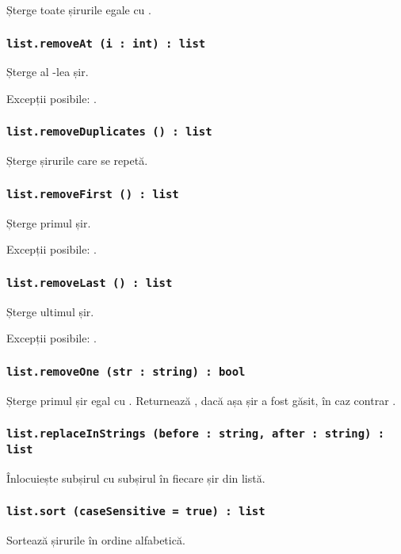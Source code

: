 Șterge toate șirurile egale cu .

\subsubsection{\lstinline|list.removeAt (i : int) : list|}

Șterge al -lea șir.

Excepții posibile: .

\subsubsection{\lstinline|list.removeDuplicates () : list|}

Șterge șirurile care se repetă.

\subsubsection{\lstinline|list.removeFirst () : list|}

Șterge primul șir.

Excepții posibile: .

\subsubsection{\lstinline|list.removeLast () : list|}

Șterge ultimul șir.

Excepții posibile: .

\subsubsection{\lstinline|list.removeOne (str : string) : bool|}

Șterge primul șir egal cu . Returnează \true, dacă așa șir a fost găsit, în caz contrar \false.

\subsubsection{\lstinline|list.replaceInStrings (before : string, after : string) : list|}

Înlocuiește subșirul  cu subșirul  în fiecare șir din listă.

\subsubsection{\lstinline|list.sort (caseSensitive = true) : list|}

Sortează șirurile în ordine alfabetică.

